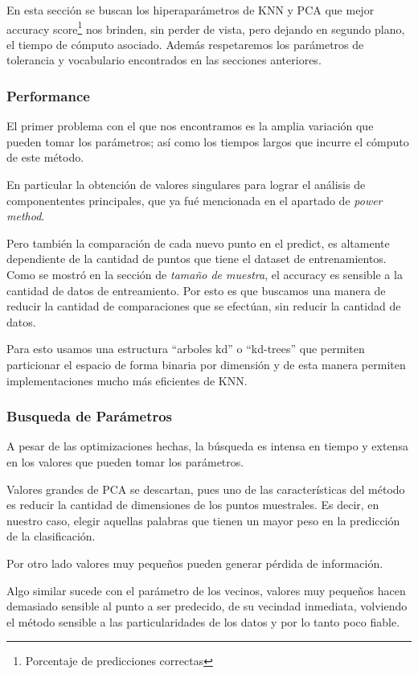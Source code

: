 En esta sección se buscan los hiperaparámetros de KNN y PCA que mejor
accuracy score\footnote{Porcentaje de predicciones correctas} nos brinden, sin perder de vista, pero dejando en segundo
plano, el tiempo de cómputo asociado. Además respetaremos los
parámetros de tolerancia y vocabulario encontrados en las secciones
anteriores.

\subsubsection{Performance}

El primer problema con el que nos encontramos es la amplia variación
que pueden tomar los parámetros; así como los tiempos largos que
incurre el cómputo de este método.

En particular la obtención de valores singulares para lograr el
análisis de componententes principales, que ya fué mencionada en el
apartado de \emph{power method}.

Pero también la comparación de cada nuevo punto en el predict, es
altamente dependiente de la cantidad de puntos que tiene el dataset de
entrenamientos. Como se mostró en la sección de \emph{tamaño de
  muestra}, el accuracy es sensible a la cantidad de datos de
entreamiento. Por esto es que buscamos una manera de reducir la
cantidad de comparaciones que se efectúan, sin reducir la cantidad de
datos.

Para esto usamos una estructura ``arboles kd'' o ``kd-trees'' que
permiten particionar el espacio de forma binaria por dimensión y de
esta manera permiten implementaciones mucho más eficientes de KNN.

\subsubsection{Busqueda de Parámetros}

A pesar de las optimizaciones hechas, la búsqueda es intensa en tiempo
y extensa en los valores que pueden tomar los parámetros.

Valores grandes de PCA se descartan, pues uno de las características
del método es reducir la cantidad de dimensiones de los puntos
muestrales. Es decir, en nuestro caso, elegir aquellas palabras que
tienen un mayor peso en la predicción de la clasificación.

Por otro lado valores muy pequeños pueden generar pérdida de información.

Algo similar sucede con el parámetro de los vecinos, valores muy
pequeños hacen demasiado sensible al punto a ser predecido, de su
vecindad inmediata, volviendo el método sensible a las
particularidades de los datos y por lo tanto poco fiable.

